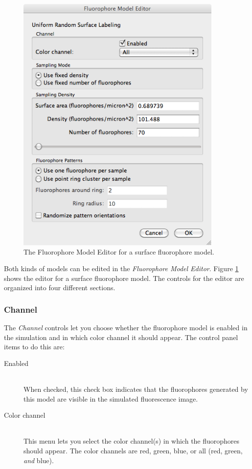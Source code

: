 \documentclass[11pt,titlepage,twoside]{article}
\begin{document}
\begin{figure}[htbp] %
   \centering
   \includegraphics[width=4in]{images/FluorophoreModelEditor} 
   \caption{The Fluorophore Model Editor for a surface fluorophore model.}
   \label{fig:FluorophoreModelEditor}
\end{figure}

Both kinds of models can be edited in the \emph{Fluorophore Model Editor}. Figure \ref{fig:FluorophoreModelEditor} shows the editor for a surface fluorophore model. The controls for the editor are organized into four different sections.

\subsubsection{Channel}

The \emph{Channel} controls let you choose whether the fluorophore model is enabled in the simulation and in which color channel it should appear. The control panel items to do this are:

\begin{description}

\item[Enabled] \hfill \\
When checked, this check box indicates that the fluorophores generated by this model are visible in the simulated fluorescence image.

\item[Color channel] \hfill \\
This menu lets you select the color channel(s) in which the fluorophores should appear. The color channels are red, green, blue, or all (red, green, \emph{and} blue).

\end{description}
\end{document}
